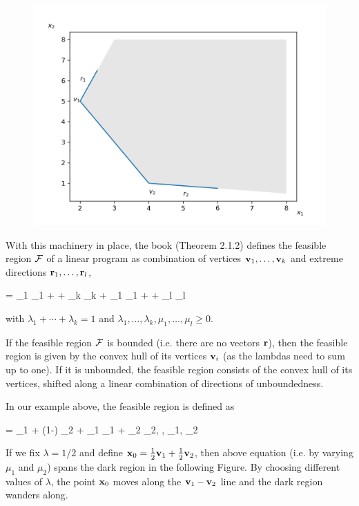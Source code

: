 \begin{figure}[H]
\includegraphics[scale = 0.7]{images/2022-09-27_lin_prog_1_03.png}
\end{figure}

With this machinery in place, the book (Theorem 2.1.2) defines the feasible region $\mathcal{F}$ of a linear program as combination of vertices $\mathbf{v}_1, \ldots, \mathbf{v}_k$ and extreme directions $\mathbf{r}_1, \ldots, \mathbf{r}_l$,

\bee
\xbf = \lambda_1 \vbf_1 + \cdots + \lambda_k \vbf_k + \mu_1 \rbf_1 + \cdots + \mu_l \rbf_l
\eee

with $\lambda_1 + \cdots + \lambda_k = 1$ and $\lambda_1, \ldots, \lambda_k, \mu_1, \ldots, \mu_l \geq 0$.

If the feasible region $\mathcal{F}$ is bounded (i.e. there are no vectors $\mathbf{r}$), then the feasible region is given by the convex hull of its vertices $\mathbf{v}_i$ (as the lambdas need to sum up to one). If it is unbounded, the feasible region consists of the convex hull of its vertices, shifted along a linear combination of directions of unboundedness.

In our example above, the feasible region is defined as

\bee
\xbf = \lambda \vbf_1 + (1-\lambda) \vbf_2 + \mu_1 \rbf_1 + \mu_2 \rbf_2, \quad \lambda, \mu_1, \mu_2 
\eee

If we fix $\lambda = 1/2$ and define $\mathbf{x}_0 = \frac{1}{2} \mathbf{v}_1 + \frac{1}{2} \mathbf{v}_2$, then above equation (i.e. by varying $\mu_1$ and $\mu_2$) spans the dark region in the following Figure. By choosing different values of $\lambda$, the point $\mathbf{x}_0$ moves along the $\mathbf{v}_1 - \mathbf{v}_2$ line and the dark region wanders along.

